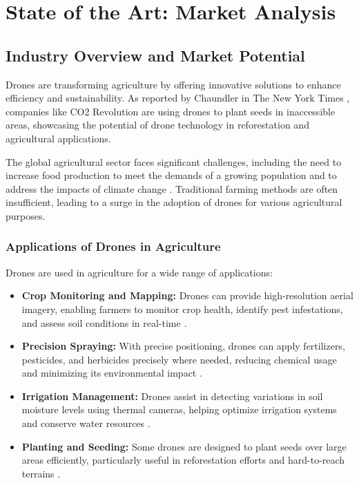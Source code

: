 \chapter{State of the Art: Market Analysis}

\section{Industry Overview and Market Potential}

Drones are transforming agriculture by offering innovative solutions to enhance efficiency and sustainability. As reported by Chaundler in The New York Times \cite{chaundler2021}, companies like CO2 Revolution \cite{co2_revolution} are using drones to plant seeds in inaccessible areas, showcasing the potential of drone technology in reforestation and agricultural applications.

The global agricultural sector faces significant challenges, including the need to increase food production to meet the demands of a growing population and to address the impacts of climate change \citep{nazarov2023}. Traditional farming methods are often insufficient, leading to a surge in the adoption of drones for various agricultural purposes.

\subsection{Applications of Drones in Agriculture}

Drones are used in agriculture for a wide range of applications:

\begin{itemize} 
	\item \textbf{Crop Monitoring and Mapping:} Drones can provide high-resolution aerial imagery, enabling farmers to monitor crop health, identify pest infestations, and assess soil conditions in real-time \citep{nazarov2023, alliedmarketresearch2021}. 
	\item \textbf{Precision Spraying:} With precise positioning, drones can apply fertilizers, pesticides, and herbicides precisely where needed, reducing chemical usage and minimizing its environmental impact \citep{guardianagriculture, plantdiseasedetection2023}.
	\item \textbf{Irrigation Management:} Drones assist in detecting variations in soil moisture levels using thermal cameras, helping optimize irrigation systems and conserve water resources \citep{nazarov2023}. 
	\item \textbf{Planting and Seeding:} Some drones are designed to plant seeds over large areas efficiently, particularly useful in reforestation efforts and hard-to-reach terrains \citep{chaundler2021}. 
\end{itemize}

